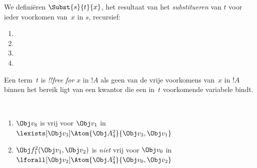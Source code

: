 \documentclass[../../../include/open-logic-section]{subfiles}
\begin{document}


\begin{defn}
We definiëren $\Subst{s}{t}{x}$, het resultaat van het
\emph{substitueren} van $t$ voor ieder voorkomen van~$x$ in $s$,
recursief:
\begin{enumerate}
\item {}

\item {}

\item {}

\item{}
\end{enumerate}
\end{defn}

\begin{defn}
Een term~$t$ is \emph{!!{free for}} $x$ in $!A$ als geen van de vrije
voorkomens van~$x$ in $!A$ binnen het bereik ligt van een kwantor die
een in~$t$ voorkomende variabele bindt.
\end{defn}

\begin{ex} ~
\begin{enumerate}
\item $\Obj v_8$ is vrij voor $\Obj v_1$ in $\lexists[\Obj
  v_3]\Atom{\Obj A^2_4}{\Obj v_3,\Obj v_1}$

\item $\Obj f^2_1(\Obj v_1, \Obj v_2)$ is \emph{niet} vrij voor $\Obj
  v_0$ in $\lforall[\Obj v_2]\Atom{\Obj A^2_4}{\Obj v_0,\Obj v_2}$
\end{enumerate}
\end{ex}
\end{document}
